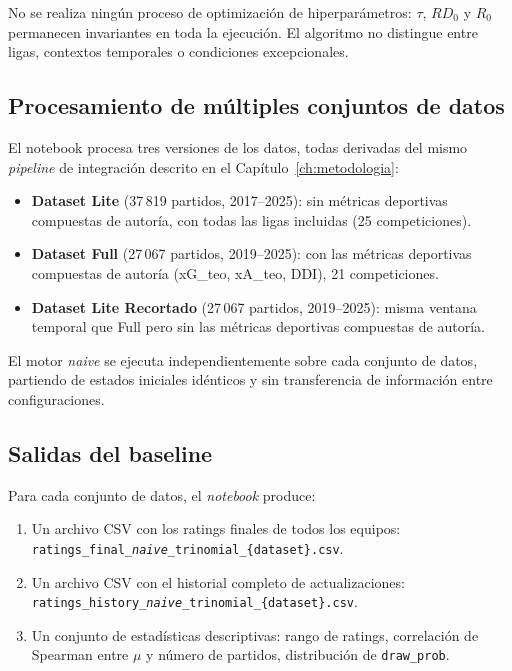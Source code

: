 No se realiza ning\'un proceso de optimizaci\'on de hiperpar\'ametros: $\tau$, $RD_0$ y $R_0$ permanecen invariantes en toda la ejecuci\'on. El algoritmo no distingue entre ligas, contextos temporales o condiciones excepcionales.

\subsection{Procesamiento de m\'ultiples conjuntos de datos}

El notebook procesa tres versiones de los datos, todas derivadas del mismo \textit{pipeline} de integraci\'on descrito en el Cap\'itulo~\ref{ch:metodologia}:
\begin{itemize}
	\item \textbf{Dataset Lite} (37\,819 partidos, 2017--2025): sin m\'etricas deportivas compuestas de autor\'ia, con todas las ligas incluidas (25 competiciones).
	\item \textbf{Dataset Full} (27\,067 partidos, 2019--2025): con las m\'etricas deportivas compuestas de autor\'ia (xG\_teo, xA\_teo, DDI), 21 competiciones.
	\item \textbf{Dataset Lite Recortado} (27\,067 partidos, 2019--2025): misma ventana temporal que Full pero sin las m\'etricas deportivas compuestas de autor\'ia.
\end{itemize}

El motor \textit{naive} se ejecuta independientemente sobre cada conjunto de datos, partiendo de estados iniciales id\'enticos y sin transferencia de informaci\'on entre configuraciones.

\subsection{Salidas del baseline}

Para cada conjunto de datos, el \textit{notebook} produce:
\begin{enumerate}
	\item Un archivo CSV con los ratings finales de todos los equipos:\\ \texttt{ratings\_final\_\textit{naive}\_trinomial\_\{dataset\}.csv}.
	\item Un archivo CSV con el historial completo de actualizaciones:\\ \texttt{ratings\_history\_\textit{naive}\_trinomial\_\{dataset\}.csv}.
	\item Un conjunto de estad\'isticas descriptivas: rango de ratings, correlaci\'on de Spearman entre $\mu$ y n\'umero de partidos, distribuci\'on de \texttt{draw\_prob}.
\end{enumerate}

